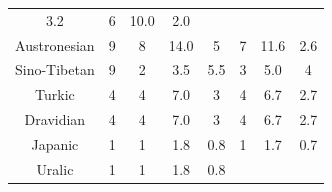 \begin{center}
{\begin{tabular}{|c|c|c|c|c|c|c|c|}
3.2& 
	

6& 
	

10.0& 
	

2.0\\ 

Austronesian &
	

9& 
	

8& 
	

14.0& 
	

5& 
	

7& 
	

11.6& 
	

2.6\\ 

Sino-Tibetan &
	

9& 
	

2& 
	

3.5& 
	

5.5& 
	

3& 
	

5.0& 
	

4\\ 

Turkic &
	

4& 
	

4& 
	

7.0& 
	

3& 
	

4& 
	

6.7& 
	

2.7\\ 

Dravidian &
	

4& 
	

4& 
	

7.0& 
	

3& 
	

4& 
	

6.7& 
	

2.7\\ 

Japanic &
	

1& 
	

1& 
	

1.8& 
	

0.8& 
	

1& 
	

1.7& 
	

0.7\\ 

Uralic &
	

1& 
	

1& 
	

1.8& 
	

0.8& 
	


\end{tabular}}
\end{center}
